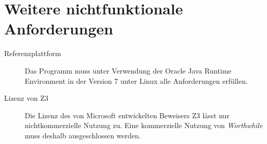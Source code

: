 \section{Weitere nichtfunktionale Anforderungen}%

\begin{description}%
    \item [Referenzplattform] Das Programm muss unter Verwendung der Oracle Java Runtime Environment in der Version 7 unter Linux alle Anforderungen erfüllen.
    \item [Lizenz von Z3] Die Lizenz des von Microsoft entwickelten Beweisers Z3 lässt nur nichtkommerzielle Nutzung zu. Eine kommerzielle Nutzung von \emph{Worthwhile} muss deshalb ausgeschlossen werden.
\end{description}
